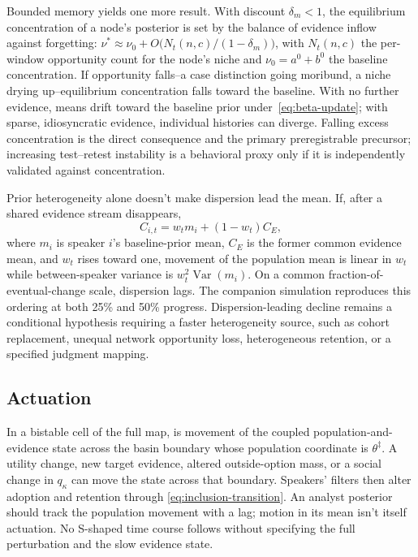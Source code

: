 Bounded memory yields one more result. With discount $\delta_m<1$, the
equilibrium concentration of a node's posterior is set by the balance of
evidence inflow against forgetting:
$\nu^{\ast}\approx\nu_0+O\bigl(N_t(n,c)/(1-\delta_m)\bigr)$, with $N_t(n,c)$ the
per-window opportunity count for the node's niche and $\nu_0=a^0+b^0$ the baseline
concentration. If opportunity falls--a case distinction going moribund, a niche
drying up--equilibrium concentration falls toward the baseline. With no further
evidence, means drift toward the baseline prior under~\eqref{eq:beta-update};
with sparse, idiosyncratic evidence, individual histories can diverge. Falling
excess concentration is the direct consequence and the primary preregistrable
precursor; increasing test--retest instability is a behavioral proxy only if it
is independently validated against concentration.

Prior heterogeneity alone doesn't make dispersion lead the mean. If, after a
shared evidence stream disappears,
\[
C_{i,t}=w_t m_i+(1-w_t)C_E,
\]
where $m_i$ is speaker $i$'s baseline-prior mean, $C_E$ is the former common
evidence mean, and $w_t$ rises toward one, movement of the population mean is
linear in $w_t$ while between-speaker variance is
$w_t^2\operatorname{Var}(m_i)$. On a common fraction-of-eventual-change scale,
dispersion lags. The companion simulation reproduces this ordering at
both 25\% and 50\% progress. Dispersion-leading decline remains a conditional
hypothesis requiring a faster heterogeneity source, such as cohort replacement,
unequal network opportunity loss, heterogeneous retention, or a specified
judgment mapping.

\subsection{Actuation}
\label{sec:actuation}

In a bistable cell of the full map,  is movement of the coupled
population-and-evidence state across the basin boundary whose population
coordinate is $\theta^\ddagger$. A utility change, new target evidence, altered
outside-option mass, or a social change in $q_\kappa$ can move the state across
that boundary. Speakers' filters then alter adoption and retention through
\eqref{eq:inclusion-transition}. An analyst posterior should track the
population movement with a lag; motion in its mean isn't itself actuation.
No S-shaped time course follows without specifying the full perturbation and
the slow evidence state.

